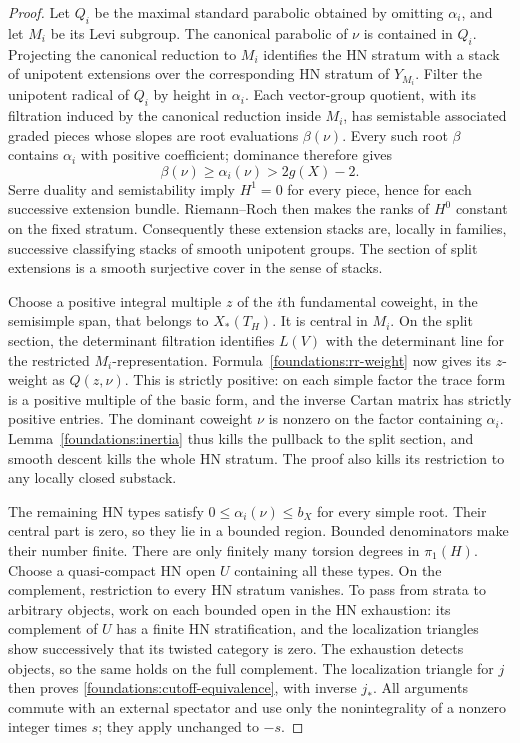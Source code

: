\begin{proof}
Let $Q_i$ be the maximal standard parabolic obtained by omitting
$\alpha_i$, and let $M_i$ be its Levi subgroup.  The canonical parabolic
of $\nu$ is contained in $Q_i$.  Projecting the canonical reduction to
$M_i$ identifies the HN stratum with a stack of unipotent extensions over
the corresponding HN stratum of $Y_{M_i}$.  Filter the unipotent radical
of $Q_i$ by height in $\alpha_i$.  Each vector-group quotient, with its
filtration induced by the canonical reduction inside $M_i$, has
semistable associated graded pieces whose slopes are root evaluations
$\beta(\nu)$.  Every such root $\beta$ contains $\alpha_i$ with positive
coefficient; dominance therefore gives
\[
 \beta(\nu)\geq\alpha_i(\nu)>2g(X)-2.
\]
Serre duality and semistability imply $H^1=0$ for every piece, hence for
each successive extension bundle.  Riemann--Roch then makes the ranks of
$H^0$ constant on the fixed stratum.  Consequently these extension stacks
are, locally in families, successive classifying stacks of smooth
unipotent groups.  The section of split extensions is a smooth
surjective cover in the sense of stacks.

Choose a positive integral multiple $z$ of the $i$th fundamental
coweight, in the semisimple span, that belongs to $X_*(T_H)$.  It is
central in $M_i$.  On the split section, the determinant filtration
identifies $L(V)$ with the determinant line for the restricted
$M_i$-representation.  Formula~\eqref{foundations:rr-weight} now gives
its $z$-weight as $Q(z,\nu)$.  This is strictly positive: on each simple
factor the trace form is a positive multiple of the basic form, and the
inverse Cartan matrix has strictly positive entries.  The dominant
coweight $\nu$ is nonzero on the factor containing $\alpha_i$.
Lemma~\ref{foundations:inertia} thus kills the pullback to the split
section, and smooth descent kills the whole HN stratum.  The proof also
kills its restriction to any locally closed substack.

The remaining HN types satisfy $0\leq\alpha_i(\nu)\leq b_X$ for every
simple root.  Their central part is zero, so they lie in a bounded
region.  Bounded denominators make their number finite.  There are only
finitely many torsion degrees in $\pi_1(H)$.  Choose a quasi-compact HN
open $U$ containing all these types.  On the complement, restriction to
every HN stratum vanishes.  To pass from strata to arbitrary objects,
work on each bounded open in the HN exhaustion: its complement of $U$
has a finite HN stratification, and the localization triangles show
successively that its twisted category is zero.  The exhaustion detects
objects, so the same holds on the full complement.  The localization
triangle for $j$ then proves \eqref{foundations:cutoff-equivalence}, with
inverse $j_*$.  All arguments commute with an external spectator and
use only the nonintegrality of a nonzero integer times $s$; they apply
unchanged to $-s$.
\end{proof}

